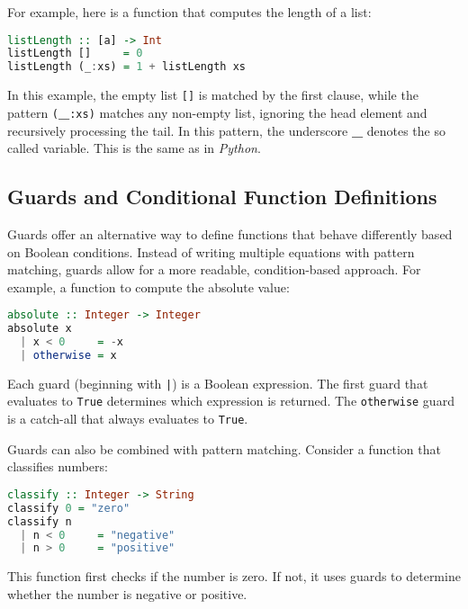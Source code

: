 For example, here is a function that computes the length of a list:
\begin{lstlisting}[style=haskellstyle, language=Haskell]
listLength :: [a] -> Int
listLength []     = 0
listLength (_:xs) = 1 + listLength xs
\end{lstlisting}
In this example, the empty list \texttt{[]} is matched by the first clause, while the pattern
\texttt{(}\textbf{\_}\texttt{:xs)}
matches any non-empty list, ignoring the head element and recursively processing the tail.  In this pattern,
the underscore \textbf{\_} denotes the so called  variable.  This is the same as in
\textsl{Python}. 

\subsection{Guards and Conditional Function Definitions}
Guards offer an alternative way to define functions that behave differently based on Boolean conditions. Instead of writing multiple equations with pattern matching, guards allow for a more readable, condition-based approach. For example, a function to compute the absolute value:
\begin{lstlisting}[style=haskellstyle, language=Haskell]
absolute :: Integer -> Integer
absolute x 
  | x < 0     = -x
  | otherwise = x
\end{lstlisting}
Each guard (beginning with \texttt{|}) is a Boolean expression. The first guard that evaluates to \texttt{True} determines which expression is returned. The \texttt{otherwise} guard is a catch-all that always evaluates to \texttt{True}.

Guards can also be combined with pattern matching. Consider a function that classifies numbers:
\begin{lstlisting}[style=haskellstyle, language=Haskell]
classify :: Integer -> String
classify 0 = "zero"
classify n 
  | n < 0     = "negative"
  | n > 0     = "positive"
\end{lstlisting}
This function first checks if the number is zero. If not, it uses guards to determine whether the number is negative or positive.

